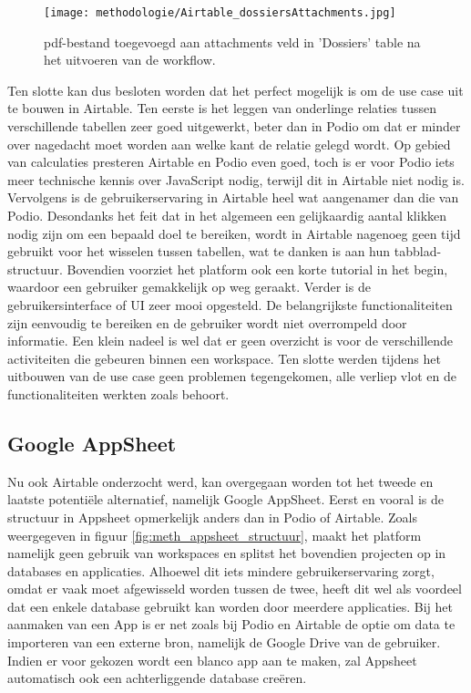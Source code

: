 \begin{figure}[h]
    \centering
    \texttt{[image: methodologie/Airtable\_dossiersAttachments.jpg]}
    \caption{pdf-bestand toegevoegd aan attachments veld in 'Dossiers' table na het uitvoeren van de workflow.}
    \label{fig:meth_airtable_dossiersAttachments}
\end{figure}

Ten slotte kan dus besloten worden dat het perfect mogelijk is om de use case uit te bouwen in Airtable. Ten eerste is het leggen van onderlinge relaties tussen verschillende tabellen zeer goed uitgewerkt, beter dan in Podio om dat er minder over nagedacht moet worden aan welke kant de relatie gelegd wordt. Op gebied van calculaties presteren Airtable en Podio even goed, toch is er voor Podio iets meer technische kennis over JavaScript nodig, terwijl dit in Airtable niet nodig is. Vervolgens is de gebruikerservaring in Airtable heel wat aangenamer dan die van Podio. Desondanks het feit dat in het algemeen een gelijkaardig aantal klikken nodig zijn om een bepaald doel te bereiken, wordt in Airtable nagenoeg geen tijd gebruikt voor het wisselen tussen tabellen, wat te danken is aan hun tabblad-structuur. Bovendien voorziet het platform ook een korte tutorial in het begin, waardoor een gebruiker gemakkelijk op weg geraakt. Verder is de gebruikersinterface of UI zeer mooi opgesteld. De belangrijkste functionaliteiten zijn eenvoudig te bereiken en de gebruiker wordt niet overrompeld door informatie. Een klein nadeel is wel dat er geen overzicht is voor de verschillende activiteiten die gebeuren binnen een workspace. Ten slotte werden tijdens het uitbouwen van de use case geen problemen tegengekomen, alle verliep vlot en de functionaliteiten werkten zoals behoort. \\

\newpage



\subsection{Google AppSheet} %

Nu ook Airtable onderzocht werd, kan overgegaan worden tot het tweede en laatste potentiële alternatief, namelijk Google AppSheet. Eerst en vooral is de structuur in Appsheet opmerkelijk anders dan in Podio of Airtable. Zoals weergegeven in figuur \ref{fig:meth_appsheet_structuur}, maakt het platform namelijk geen gebruik van workspaces en splitst het bovendien projecten op in databases en applicaties. Alhoewel dit iets mindere gebruikerservaring zorgt, omdat er vaak moet afgewisseld worden tussen de twee, heeft dit wel als voordeel dat een enkele database gebruikt kan worden door meerdere applicaties. Bij het aanmaken van een App is er net zoals bij Podio en Airtable de optie om data te importeren van een externe bron, namelijk de Google Drive van de gebruiker. Indien er voor gekozen wordt een blanco app aan te maken, zal Appsheet automatisch ook een achterliggende database creëren. \\

